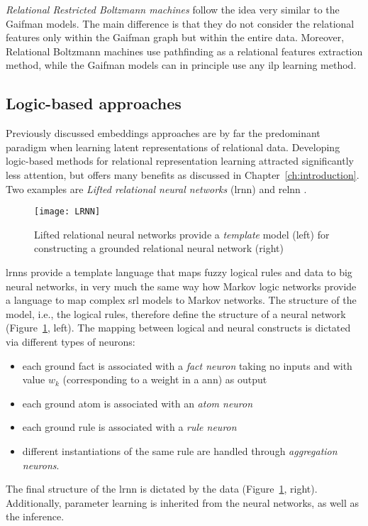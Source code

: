 \textit{Relational Restricted Boltzmann machines} follow the idea very similar to the Gaifman models.
The main difference is that they do not consider the relational features only within the Gaifman graph but within the entire data.
Moreover, Relational Boltzmann machines use pathfinding as a relational features extraction method, while the Gaifman models can in principle use any \gls{ilp} learning method.






\subsection{Logic-based approaches}


Previously discussed embeddings approaches are by far the predominant paradigm when learning latent representations of relational data.
Developing logic-based methods for relational representation learning attracted significantly less attention, but offers many benefits as discussed in Chapter~\ref{ch:introduction}.
Two examples are \textit{Lifted relational neural networks} (\gls{lrnn}) \cite{LRNN} and \gls{relnn} \cite{Kazemi2018}.

\begin{figure}
	\medskip
	\centering
	\texttt{[image: LRNN]}
	\caption[Lifted relational neural networks]{Lifted relational neural networks provide a \textit{template} model (left) for constructing a grounded relational neural network (right)\label{fig:lrnn}}
\end{figure}



\gls{lrnn}s provide a template language that maps  fuzzy logical rules and data to big neural networks, in very much the same way how Markov logic networks provide a language to map complex \gls{srl} models to Markov networks.
The structure of the model, i.e.,  the logical rules, therefore define the structure of a neural network (Figure~\ref{fig:lrnn}, left).
The mapping between logical and neural constructs is dictated via different types of neurons:
\begin{itemize}
	\item each ground fact is associated with a \textit{fact neuron} taking no inputs and with value $w_k$ (corresponding to a weight in a \gls{ann}) as output
	\item each ground atom is associated with an \textit{atom neuron}
	\item each ground rule is associated with a \textit{rule neuron}
	\item different instantiations of the same rule are handled through \textit{aggregation neurons}.
\end{itemize}
The final structure of the \gls{lrnn} is dictated by the data (Figure~\ref{fig:lrnn}, right).
Additionally, parameter learning is inherited from the neural networks, as well as the inference.





